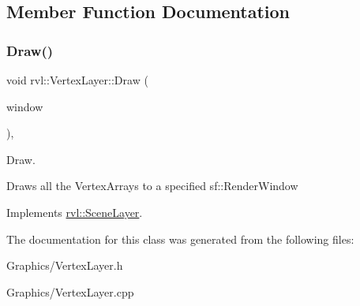 \subsection{Member Function Documentation}
\mbox{\label{classrvl_1_1_vertex_layer_aa6c20822af0bcbf0c57329348b92c0b4}} 
\subsubsection{\texorpdfstring{Draw()}{Draw()}}
{\footnotesize\ttfamily void rvl\+::\+Vertex\+Layer\+::\+Draw (\begin{DoxyParamCaption}\item[{sf\+::\+Render\+Window \&}]{window }\end{DoxyParamCaption})\hspace{0.3cm}{\ttfamily [override]}, {\ttfamily [virtual]}}



Draw. 

Draws all the Vertex\+Arrays to a specified sf\+::\+Render\+Window 

Implements \hyperlink{classrvl_1_1_scene_layer}{rvl\+::\+Scene\+Layer}.



The documentation for this class was generated from the following files\+:\begin{DoxyCompactItemize}
\item 
Graphics/Vertex\+Layer.\+h\item 
Graphics/Vertex\+Layer.\+cpp\end{DoxyCompactItemize}
